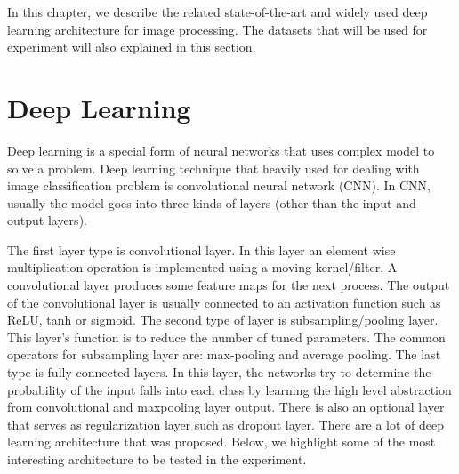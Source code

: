 

In this chapter, we describe the related state-of-the-art and widely used deep learning architecture for image processing. The datasets that will be used for experiment will also explained in this section.  




\section{Deep Learning}
Deep learning is a special form of neural networks that uses complex model to solve a problem. Deep learning technique that heavily used for dealing with image classification problem is convolutional neural network (CNN). In CNN, usually the model goes into three kinds of layers (other than the input and output layers).

The first layer type is convolutional layer. In this layer an element wise multiplication operation is implemented using a moving kernel/filter. A convolutional layer produces some feature maps for the next process. The output of the convolutional layer is usually connected to an activation function such as ReLU, tanh or sigmoid. The second type of layer is subsampling/pooling layer. This layer's function is to reduce the number of tuned parameters. The common operators for subsampling layer are: max-pooling and average pooling. The last type is fully-connected layers. In this layer, the networks try to determine the probability of the input falls into each class by learning the high level abstraction from convolutional and maxpooling layer output. There is also an optional layer that serves as regularization layer such as dropout layer. There are a lot of deep learning architecture that was proposed. Below, we highlight some of the most interesting architecture to be tested in the experiment. 
